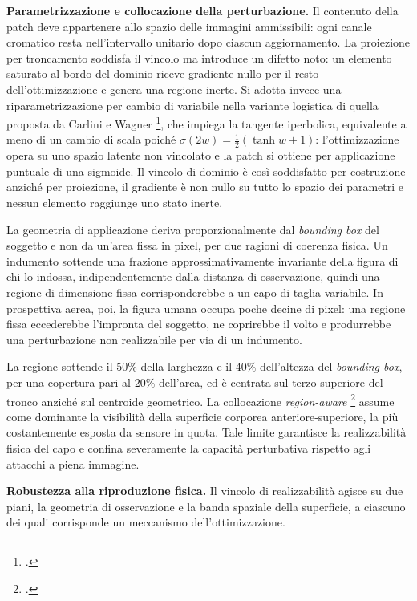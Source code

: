 \ifstampa\documentclass[a4paper,12pt,twoside,openright]{report}\else\documentclass[a4paper,12pt]{report}\fi
\newif\ifrevisione \revisionefalse
\DeclareRobustCommand{\rev}[1]{\ifrevisione{\color{blue!65!black}#1}\else#1\fi}
\begin{document}
\textbf{Parametrizzazione e collocazione della perturbazione.}
\label{sec:sigmoide}
\label{sec:collocazione}
Il contenuto della patch deve appartenere allo spazio delle immagini
ammissibili: ogni canale cromatico resta nell'intervallo unitario dopo ciascun
aggiornamento. La proiezione per troncamento soddisfa il vincolo ma introduce un
difetto noto: un elemento saturato al bordo del dominio riceve gradiente nullo
per il resto dell'ottimizzazione e genera una regione inerte. Si adotta invece
una riparametrizzazione per cambio di variabile \rev{nella variante logistica di
quella proposta da Carlini e Wagner} \footcite{carlini_2017}\rev{, che impiega la
tangente iperbolica, equivalente a meno di un cambio di scala poiché
$\sigma(2w) = \tfrac{1}{2}(\tanh w + 1)$}: l'ottimizzazione opera su uno spazio
latente non vincolato e la patch si ottiene per applicazione puntuale di una
sigmoide. Il vincolo di dominio è così soddisfatto per costruzione anziché per
proiezione, il gradiente è non nullo su tutto lo spazio dei parametri e nessun
elemento raggiunge uno stato inerte.

La geometria di applicazione deriva proporzionalmente dal \textit{bounding box}
del soggetto e non da un'area fissa in pixel, per due ragioni di coerenza
fisica. Un indumento sottende una frazione approssimativamente invariante della
figura di chi lo indossa, indipendentemente dalla distanza di osservazione,
quindi una regione di dimensione fissa corrisponderebbe a un capo di taglia
variabile. In prospettiva aerea, poi, la figura umana occupa poche decine di
pixel: una regione fissa eccederebbe l'impronta del soggetto, ne coprirebbe il
volto e produrrebbe una perturbazione non realizzabile per via di un indumento.

La regione sottende il $50\%$ della larghezza e il $40\%$ dell'altezza del
\textit{bounding box}, per una copertura pari al $20\%$ dell'area, ed è centrata
sul terzo superiore del tronco anziché sul centroide geometrico. La collocazione
\textit{region-aware} \footcite{huang_2020_upc} assume come dominante la
visibilità della superficie corporea anteriore-superiore, la più costantemente
esposta da sensore in quota. Tale limite garantisce la realizzabilità fisica del
capo e confina severamente la capacità perturbativa rispetto agli attacchi a
piena immagine.

\textbf{Robustezza alla riproduzione fisica.}
\label{sec:eot}
\label{sec:tv}
Il vincolo di realizzabilità agisce su due piani, la geometria di osservazione e
la banda spaziale della superficie, a ciascuno dei quali corrisponde un
meccanismo dell'ottimizzazione.
\end{document}
